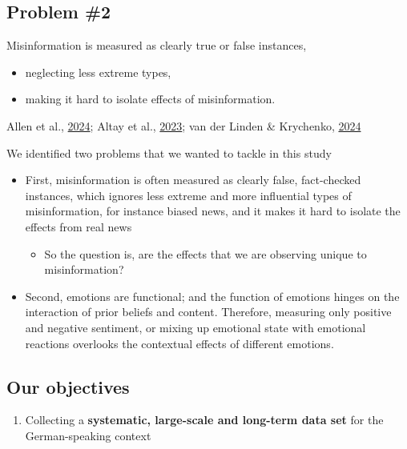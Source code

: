\documentclass[
  letterpaper,
  DIV=11,
  numbers=noendperiod]{scrartcl}
\providecommand{\tightlist}{%
  \setlength{\itemsep}{0pt}\setlength{\parskip}{0pt}}\usepackage{longtable,booktabs,array}
\begin{document}
\hypertarget{problem-2}{%
\subsection{Problem \#2}\label{problem-2}}

Misinformation is measured as clearly true or false instances,

\begin{itemize}
\item
  neglecting less extreme types,
\item
  making it hard to isolate effects of misinformation.
\end{itemize}

Allen et al.,
\href{https://www.science.org/doi/10.1126/science.adk3451}{2024}; Altay
et al., \href{https://doi.org/10.1177/20563051221150412}{2023}; van der
Linden \& Krychenko,
\href{https://www.science.org/doi/10.1126/science.adp9117}{2024}

We identified two problems that we wanted to tackle in this study

\begin{itemize}
\item
  First, misinformation is often measured as clearly false, fact-checked
  instances, which ignores less extreme and more influential types of
  misinformation, for instance biased news, and it makes it hard to
  isolate the effects from real news

  \begin{itemize}
  \tightlist
  \item
    So the question is, are the effects that we are observing unique to
    misinformation?
  \end{itemize}
\item
  Second, emotions are functional; and the function of emotions hinges
  on the interaction of prior beliefs and content. Therefore, measuring
  only positive and negative sentiment, or mixing up emotional state
  with emotional reactions overlooks the contextual effects of different
  emotions.
\end{itemize}

\hypertarget{our-objectives}{%
\subsection{Our objectives}\label{our-objectives}}

\begin{enumerate}
\def\labelenumi{\arabic{enumi}.}
\tightlist
\item
  Collecting a \textbf{systematic, large-scale and long-term data set}
  for the German-speaking context
\end{enumerate}
\end{document}
